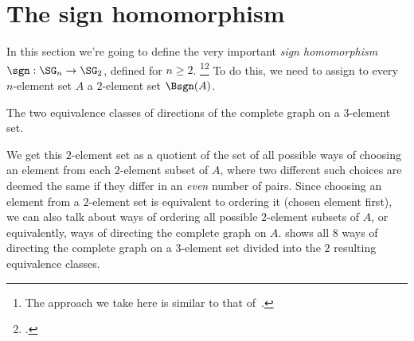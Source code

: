 \section{The sign homomorphism}
\label{sec:sign-homomorphism}

In this section we're going to define the very important
\emph{sign homomorphism} $\sgn : \SG_n \to \SG_2$, defined for $n \ge 2$.%
\footnote{%
  The approach we take here is similar to that
  of~\citeauthor{MangelRijke2023}\footnotemark{}.}\footcitetext{MangelRijke2023}
To do this, we need to assign to every $n$-element set $A$ a $2$-element set $\Bsgn(A)$.
\begin{marginfigure}
  \caption{The two equivalence classes of directions of the complete graph
    on a $3$-element set.}
  \label{fig:sign-orderings-3}
\end{marginfigure}

We get this $2$-element set as a quotient of the set of all possible ways of
choosing an element from each $2$-element subset of $A$, 
where two different such
choices are deemed the same if they differ in an \emph{even} number of pairs.
Since choosing an element from a $2$-element set is equivalent to ordering it
(\eg chosen element first),
we can also talk about ways of ordering all possible $2$-element subsets of $A$,
or equivalently, ways of directing the complete graph on $A$.
 shows all $8$ ways of directing the complete graph on
a $3$-element set divided into the $2$ resulting equivalence classes.

